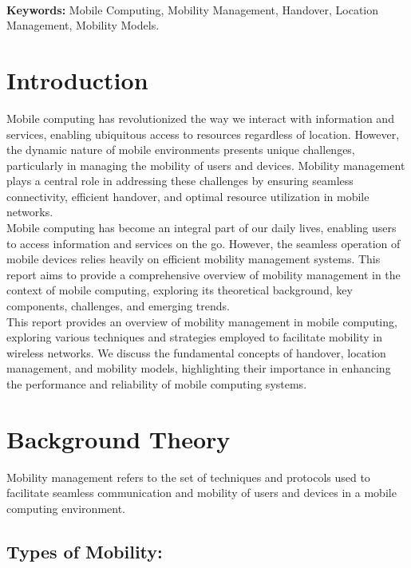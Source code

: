 \documentclass[12pt]{report}
\begin{document}
\textbf{\\Keywords:} Mobile Computing, Mobility Management, Handover, Location Management, Mobility Models.

\newpage
\section*{Introduction}
Mobile\cite{mobile} computing has revolutionized the way we interact with information and services, enabling ubiquitous access to resources regardless of location. However, the dynamic nature of mobile environments presents unique challenges, particularly in managing the mobility of users and devices. Mobility management plays a central role in addressing these challenges by ensuring seamless connectivity, efficient handover, and optimal resource utilization in mobile networks.\\

Mobile computing has become an integral part of our daily lives, enabling users to access information and services on the go. However, the seamless operation of mobile devices relies heavily on efficient mobility management systems. This report aims to provide a comprehensive overview of mobility management in the context of mobile computing, exploring its theoretical background, key components, challenges\cite{features}, and emerging trends.\\

This report provides an overview of mobility management in mobile computing, exploring various techniques and strategies employed to facilitate mobility in wireless networks. We discuss the fundamental concepts of handover, location management, and mobility models, highlighting their importance in enhancing the performance and reliability of mobile computing systems.\\





\newpage
\section*{Background Theory}
Mobility management refers to the set of techniques and protocols used to facilitate seamless communication and mobility of users and devices in a mobile computing environment.\cite{features}
\subsection*{Types of Mobility:}
\end{document}
